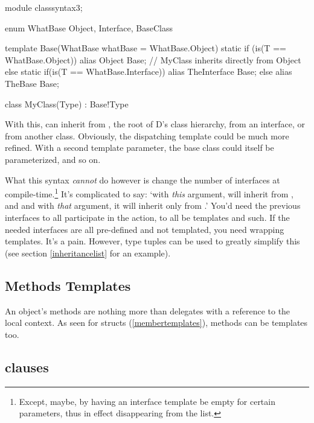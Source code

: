 \begin{dcode}
module classsyntax3;

enum WhatBase { Object, Interface, BaseClass }

template Base(WhatBase whatBase = WhatBase.Object)
{
    static if (is(T == WhatBase.Object))
        alias Object Base; // MyClass inherits directly from Object
    else static if(is(T == WhatBase.Interface))
        alias TheInterface Base;
    else
        alias TheBase Base;
}

class MyClass(Type) : Base!Type {}
\end{dcode}

With this,  can inherit from , the root of D's class hierarchy, from an interface, or from another class. Obviously, the dispatching template could be much more refined. With a second template parameter, the base class could itself be parameterized, and so on.

What this syntax \emph{cannot} do however is change the number of interfaces at compile-time.\footnote{ Except, maybe, by having an interface template be empty for certain parameters, thus in effect disappearing from the list.} It's complicated to say: `with \emph{this} argument,  will inherit from ,  and  and with \emph{that} argument, it will inherit only from .' You'd need the previous interfaces to all participate in the action, to all be templates and such. If the needed interfaces are all pre-defined and not templated, you need wrapping templates. It's a pain. However, type tuples can be used to greatly simplify this (see section \ref{inheritancelist} for an example).

\subsection{Methods Templates}\label{methodtemplates}

An object's methods are nothing more than delegates with a reference to the local  context. As seen for structs (\ref{membertemplates}), methods can be templates too.


\subsection{\texorpdfstring{ clauses}
                           {invariant clauses}}
\label{classinvariant}

